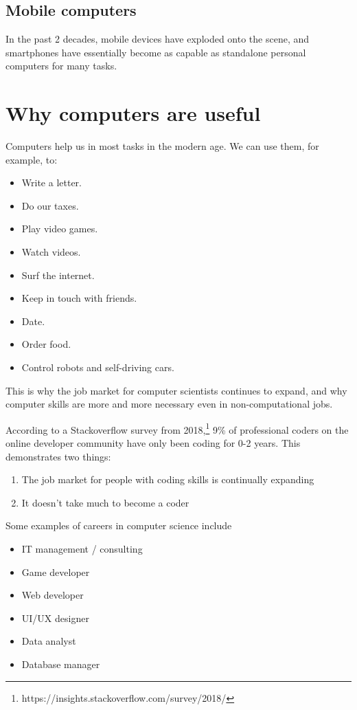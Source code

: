 \subsection{Mobile computers}
In the past 2 decades, mobile devices have exploded onto the scene, and smartphones have essentially become as capable as standalone personal computers for many tasks.

\section{Why computers are useful}

Computers help us in most tasks in the modern age. We can use them, for example, to:

\begin{itemize}
	\item Write a letter.
	\item Do our taxes.
	\item Play video games.
	\item Watch videos.
	\item Surf the internet.
	\item Keep in touch with friends.
	\item Date.
	\item Order food.
	\item Control robots and self-driving cars.
\end{itemize}

This is why the job market for computer scientists continues to expand, and why computer skills are more and more necessary even in non-computational jobs.

According to a Stackoverflow survey from 2018,\footnote{https://insights.stackoverflow.com/survey/2018/} 9\% of professional coders on the online developer community have only been coding for 0-2 years. This demonstrates two things:

\begin{enumerate}
	\item The job market for people with coding skills is continually expanding
	\item It doesn't take much to become a coder
\end{enumerate}

Some examples of careers in computer science include

\begin{itemize}
\item IT management / consulting
\item Game developer
\item Web developer
\item UI/UX designer
\item Data analyst
\item Database manager
\end{itemize}

